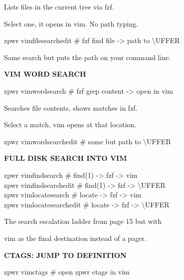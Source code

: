 \documentclass[11pt,a4paper,twoside]{book}
\begin{document}
Lists files in the current tree via fzf.

Select one, it opens in vim. No path typing.

\begin{codebox}
zpwr vimfilesearchedit      \# fzf find file -> path to \textbackslash{}UFFER\\
\end{codebox}

Same search but puts the path on your command line.


\vspace{12pt}
{\bfseries\color{neonyellow} VIM WORD SEARCH}\vspace{4pt}

\begin{codebox}
zpwr vimwordsearch          \# fzf grep content -> open in vim\\
\end{codebox}

Searches file contents, shows matches in fzf.

Select a match, vim opens at that location.

\begin{codebox}
zpwr vimwordsearchedit      \# same but path to \textbackslash{}UFFER\\
\end{codebox}


\vspace{12pt}
{\bfseries\color{neonyellow} FULL DISK SEARCH INTO VIM}\vspace{4pt}

\begin{codebox}
zpwr vimfindsearch          \# find(1) -> fzf -> vim\\
zpwr vimfindsearchedit      \# find(1) -> fzf -> \textbackslash{}UFFER\\
zpwr vimlocatesearch        \# locate -> fzf -> vim\\
zpwr vimlocatesearchedit    \# locate -> fzf -> \textbackslash{}UFFER\\
\end{codebox}

The search escalation ladder from page 15 but with

vim as the final destination instead of a pager.


\vspace{12pt}
{\bfseries\color{neonyellow} CTAGS: JUMP TO DEFINITION}\vspace{4pt}

\begin{codebox}
zpwr vimctags               \# open zpwr ctags in vim\\
\end{codebox}
\end{document}

